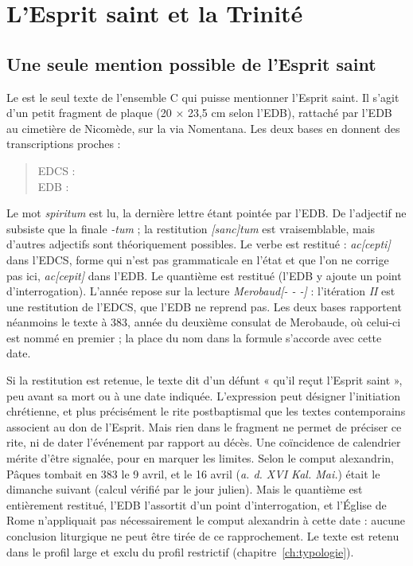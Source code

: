 \chapter{L’Esprit saint et la Trinité}\label{ch:esprit_trinite}

\section{Une seule mention possible de l’Esprit saint}

Le  est le seul texte de l’ensemble C qui puisse mentionner l’Esprit saint. Il s’agit d’un petit fragment de plaque (20 × 23,5 cm selon l’EDB), rattaché par l’EDB au cimetière de Nicomède, sur la via Nomentana. Les deux bases en donnent des transcriptions proches :

\begin{quote}\small
EDCS : \\
EDB : 
\end{quote}

Le mot \emph{spiritum} est lu, la dernière lettre étant pointée par l’EDB. De l’adjectif ne subsiste que la finale \emph{-tum} ; la restitution \emph{[sanc]tum} est vraisemblable, mais d’autres adjectifs sont théoriquement possibles. Le verbe est restitué : \emph{ac[cepti]} dans l’EDCS, forme qui n’est pas grammaticale en l’état et que l’on ne corrige pas ici, \emph{ac[cepit]} dans l’EDB. Le quantième est restitué (l’EDB y ajoute un point d’interrogation). L’année repose sur la lecture \emph{Merobaud[- - -]} : l’itération \emph{II} est une restitution de l’EDCS, que l’EDB ne reprend pas. Les deux bases rapportent néanmoins le texte à 383, année du deuxième consulat de Merobaude, où celui-ci est nommé en premier ; la place du nom dans la formule s’accorde avec cette date.

Si la restitution est retenue, le texte dit d’un défunt « qu’il reçut l’Esprit saint », peu avant sa mort ou à une date indiquée. L’expression peut désigner l’initiation chrétienne, et plus précisément le rite postbaptismal que les textes contemporains associent au don de l’Esprit. Mais rien dans le fragment ne permet de préciser ce rite, ni de dater l’événement par rapport au décès. Une coïncidence de calendrier mérite d’être signalée, pour en marquer les limites. Selon le comput alexandrin, Pâques tombait en 383 le 9 avril, et le 16 avril (\emph{a. d. XVI Kal. Mai.}) était le dimanche suivant (calcul vérifié par le jour julien). Mais le quantième est entièrement restitué, l’EDB l’assortit d’un point d’interrogation, et l’Église de Rome n’appliquait pas nécessairement le comput alexandrin à cette date : aucune conclusion liturgique ne peut être tirée de ce rapprochement. Le texte est retenu dans le profil large et exclu du profil restrictif (chapitre~\ref{ch:typologie}).

